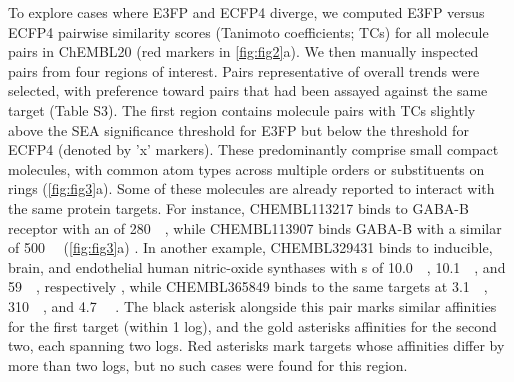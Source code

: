 \documentclass[../main.tex]{subfiles}
\begin{document}
\begin{refsection}
To explore cases where E3FP and ECFP4 diverge, we computed E3FP versus ECFP4 pairwise similarity scores (Tanimoto coefficients; TCs) for all molecule pairs in ChEMBL20 (red markers in \cref{fig:fig2}a).
We then manually inspected pairs from four regions of interest.
Pairs representative of overall trends were selected, with preference toward pairs that had been assayed against the same target (Table S3).
The first region contains molecule pairs with TCs slightly above the SEA significance threshold for E3FP but below the threshold for ECFP4  (denoted by 'x' markers).
These predominantly comprise small compact molecules, with common atom types across multiple orders or substituents on rings (\cref{fig:fig3}a).
Some of these molecules are already reported to interact with the same protein targets.
For instance, CHEMBL113217 binds to GABA-B receptor with an \ICfifty{} of \SI{280}{\nano\molar}, while CHEMBL113907 binds GABA-B with a similar \ICfifty{} of \SI{500}{\nano\molar} (\cref{fig:fig3}a) \cite{froestl_1995}.
In another example, CHEMBL329431 binds to inducible, brain, and endothelial human nitric-oxide synthases with  \ICfifty s of \SI{10.0}{\micro\molar}, \SI{10.1}{\micro\molar}, and   \SI{59}{\micro\molar}, respectively \cite{moormann_2001}, while CHEMBL365849 binds to the same targets at \SI{3.1}{\micro\molar},  \SI{310}{\nano\molar}, and \SI{4.7}{\micro\molar} \cite{shankaran_2004a}.
The black asterisk alongside this pair marks similar affinities for the first target (within 1 log), and the gold asterisks affinities for the second two, each spanning two logs.
Red asterisks mark targets whose affinities differ by more than two logs, but no such cases were found for this region.


\end{refsection}
\end{document}
